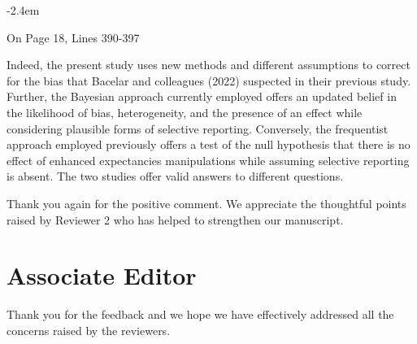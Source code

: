 \documentclass[final]{article}
\renewenvironment{quote}{\begin{fquote}\advance\leftmargini -2.4em\begin{oldquote}}{\end{oldquote}\end{fquote}}
\newenvironment{fquote}
  {\def\FrameCommand{
	\fboxsep=0.6em %
	\fcolorbox{black}{white}}%
    \MakeFramed {\advance\hsize-2\width \FrameRestore}
    \begin{minipage}{\linewidth}
  }
  {\end{minipage}\endMakeFramed}
\begin{document}
\begin{quote}
On Page 18, Lines 390-397

Indeed, the present study uses new methods and different assumptions to correct for the bias that Bacelar and colleagues (2022) suspected in their previous study. Further, the Bayesian approach currently employed offers an updated belief in the likelihood of bias, heterogeneity, and the presence of an effect while considering plausible forms of selective reporting. Conversely, the frequentist approach employed previously offers a test of the null hypothesis that there is no effect of enhanced expectancies manipulations while assuming selective reporting is absent. The two studies offer valid answers to different questions.
\end{quote}

Thank you again for the positive comment. We appreciate the thoughtful points raised by Reviewer 2 who has helped to strengthen our manuscript.

\hypertarget{associate-editor}{%
\section{Associate Editor}\label{associate-editor}}


Thank you for the feedback and we hope we have effectively addressed all the concerns raised by the reviewers.
\end{document}
